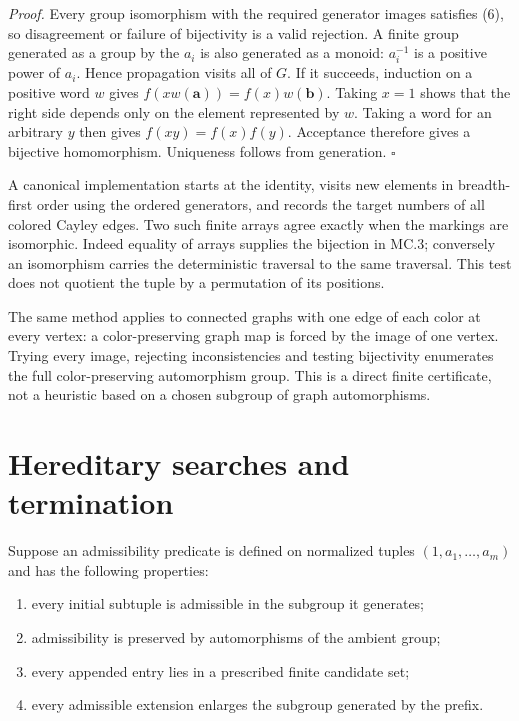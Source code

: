 \documentclass[11pt]{article}
\newcommand{\tightlist}{\setlength{\itemsep}{0pt}\setlength{\parskip}{0pt}}
\begin{document}
\emph{Proof.} Every group isomorphism with the required generator images
satisfies (6), so disagreement or failure of bijectivity is a valid
rejection. A finite group generated as a group by the \(a_i\) is also
generated as a monoid: \(a_i^{-1}\) is a positive power of \(a_i\).
Hence propagation visits all of \(G\). If it succeeds, induction on a
positive word \(w\) gives \(f(xw(\boldsymbol a))=f(x)w(\boldsymbol b)\).
Taking \(x=1\) shows that the right side depends only on the element
represented by \(w\). Taking a word for an arbitrary \(y\) then gives
\(f(xy)=f(x)f(y)\). Acceptance therefore gives a bijective homomorphism.
Uniqueness follows from generation. \(\square\)

A canonical implementation starts at the identity, visits new elements
in breadth-first order using the ordered generators, and records the
target numbers of all colored Cayley edges. Two such finite arrays agree
exactly when the markings are isomorphic. Indeed equality of arrays
supplies the bijection in MC.3; conversely an isomorphism carries the
deterministic traversal to the same traversal. This test does not
quotient the tuple by a permutation of its positions.

The same method applies to connected graphs with one edge of each color
at every vertex: a color-preserving graph map is forced by the image of
one vertex. Trying every image, rejecting inconsistencies and testing
bijectivity enumerates the full color-preserving automorphism group.
This is a direct finite certificate, not a heuristic based on a chosen
subgroup of graph automorphisms.

\section{Hereditary searches and
termination}\label{hereditary-searches-and-termination}

Suppose an admissibility predicate is defined on normalized tuples
\((1,a_1,\ldots,a_m)\) and has the following properties:

\begin{enumerate}
\def\labelenumi{\arabic{enumi}.}
\tightlist
\item
  every initial subtuple is admissible in the subgroup it generates;
\item
  admissibility is preserved by automorphisms of the ambient group;
\item
  every appended entry lies in a prescribed finite candidate set;
\item
  every admissible extension enlarges the subgroup generated by the
  prefix.
\end{enumerate}
\end{document}
